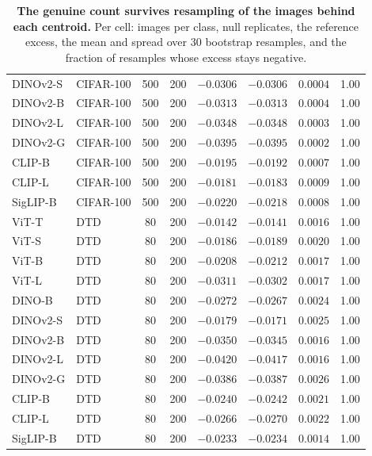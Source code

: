 \begin{table}[H]
\begin{tabular}{llcccccc}
DINOv2-S & CIFAR-100 & 500 & 200 & $-0.0306$ & $-0.0306$ & $0.0004$ & 1.00 \\
DINOv2-B & CIFAR-100 & 500 & 200 & $-0.0313$ & $-0.0313$ & $0.0004$ & 1.00 \\
DINOv2-L & CIFAR-100 & 500 & 200 & $-0.0348$ & $-0.0348$ & $0.0003$ & 1.00 \\
DINOv2-G & CIFAR-100 & 500 & 200 & $-0.0395$ & $-0.0395$ & $0.0002$ & 1.00 \\
CLIP-B & CIFAR-100 & 500 & 200 & $-0.0195$ & $-0.0192$ & $0.0007$ & 1.00 \\
CLIP-L & CIFAR-100 & 500 & 200 & $-0.0181$ & $-0.0183$ & $0.0009$ & 1.00 \\
SigLIP-B & CIFAR-100 & 500 & 200 & $-0.0220$ & $-0.0218$ & $0.0008$ & 1.00 \\
\midrule
ViT-T & DTD & 80 & 200 & $-0.0142$ & $-0.0141$ & $0.0016$ & 1.00 \\
ViT-S & DTD & 80 & 200 & $-0.0186$ & $-0.0189$ & $0.0020$ & 1.00 \\
ViT-B & DTD & 80 & 200 & $-0.0208$ & $-0.0212$ & $0.0017$ & 1.00 \\
ViT-L & DTD & 80 & 200 & $-0.0311$ & $-0.0302$ & $0.0017$ & 1.00 \\
DINO-B & DTD & 80 & 200 & $-0.0272$ & $-0.0267$ & $0.0024$ & 1.00 \\
DINOv2-S & DTD & 80 & 200 & $-0.0179$ & $-0.0171$ & $0.0025$ & 1.00 \\
DINOv2-B & DTD & 80 & 200 & $-0.0350$ & $-0.0345$ & $0.0016$ & 1.00 \\
DINOv2-L & DTD & 80 & 200 & $-0.0420$ & $-0.0417$ & $0.0016$ & 1.00 \\
DINOv2-G & DTD & 80 & 200 & $-0.0386$ & $-0.0387$ & $0.0026$ & 1.00 \\
CLIP-B & DTD & 80 & 200 & $-0.0240$ & $-0.0242$ & $0.0021$ & 1.00 \\
CLIP-L & DTD & 80 & 200 & $-0.0266$ & $-0.0270$ & $0.0022$ & 1.00 \\
SigLIP-B & DTD & 80 & 200 & $-0.0233$ & $-0.0234$ & $0.0014$ & 1.00 \\
\bottomrule
\end{tabular}
\par\vspace{2pt}
\endgroup
\caption{\textbf{The genuine count survives resampling of the images behind each centroid.} Per cell: images per class, null replicates, the reference excess, the mean and spread over 30 bootstrap resamples, and the fraction of resamples whose excess stays negative.
}
\label{tab:q8-robust}\label{tab:q8-robust-b}
\end{table}

